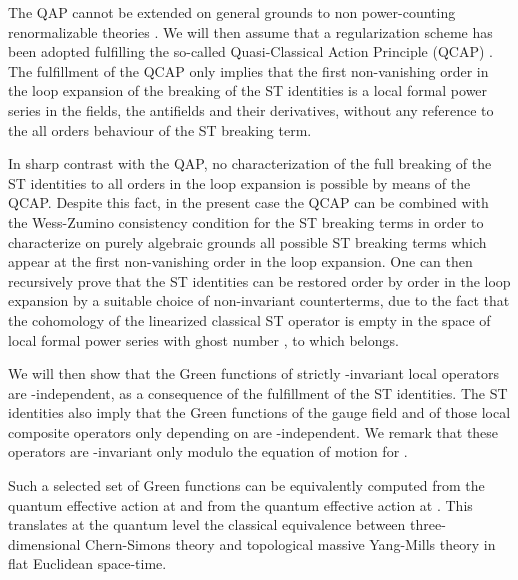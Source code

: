 \documentclass[a4paper,11pt]{article}
\begin{document}
The QAP cannot be extended on general grounds to non power-counting
renormalizable theories \cite{ET,Stora2000}.
%
We will then assume that a regularization scheme has been adopted 
fulfilling the so-called Quasi-Classical Action Principle (QCAP) \cite{ET,Stora2000}.
The fulfillment of the QCAP only implies that the first non-vanishing
order in the loop expansion of the breaking of the ST identities
is a local formal power series in the fields, the antifields and
their derivatives, without any reference to the all orders behaviour
of the ST breaking term.

In sharp contrast with the QAP, no characterization of the full breaking
of the ST identities to all orders in the loop expansion is possible
by means of the QCAP. Despite this fact, in the present case the QCAP
can be combined with the Wess-Zumino consistency condition 
\cite{Piguet:er,Wess:yu}
for the
ST breaking terms 
in order
to characterize 
on purely algebraic 
grounds
all possible ST breaking terms \coordHE{} which appear
at the first non-vanishing order \coordHE{} in the loop expansion.
One can then recursively prove that the ST identities can be restored 
order by  order in the loop expansion by a suitable choice of non-invariant 
counterterms, due to the fact that the cohomology of the 
linearized classical ST operator
\coordHE{} is empty in the space of local formal power series with 
ghost number \coordHE{}, to which \coordHE{} belongs.

We will then show that the Green functions of strictly \coordHE{}-invariant
local operators are \myHighlight{$\lambda$}\coordHE{}-independent, as a consequence of the fulfillment
of the ST identities.
%
The ST identities also imply that  
 the Green functions of the gauge field \coordHE{}
and of those local composite operators only depending on \coordHE{}
are  \myHighlight{$\lambda$}\coordHE{}-indepen\-dent.
We remark that these operators are \coordHE{}-invariant
only modulo the equation of motion
for \coordHE{}.
%

Such a selected set of Green functions 
can be equivalently computed from the quantum effective action
at \coordHE{} and from the quantum effective action at \coordHE{}.
This translates at the quantum level the classical equivalence
between three-dimensional Chern-Simons theory and topological massive
Yang-Mills theory in flat Euclidean space-time.
\end{document}
